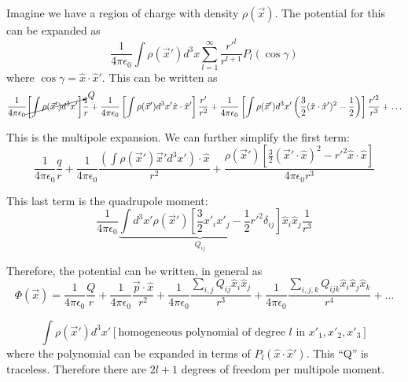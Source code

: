\documentclass[a4paper,twoside,master.tex]{subfiles}
\begin{document}

Imagine we have a region of charge with density $\rho(\vec{x})$. The potential for this can be expanded as
\begin{equation}
    \frac{1}{4\pi\epsilon_0}\int\rho(\vec{x}')d^3x \sum_{l=1}^{\infty} \frac{r'^l}{r^{l+1}}P_l(\cos\gamma)
\end{equation}
where $\cos\gamma = \hat{x}\cdot \hat{x}'$. This can be written as
\begin{equation}
\frac{1}{4\pi\epsilon_0}\cancelto{Q}{\left[ \int\rho(\vec{x}') d^3x' \right]} \frac{1}{r} + \frac{1}{4\pi\epsilon_0}\left[ \int\rho(\vec{x}') d^3x' \hat{x}\cdot \hat{x}' \right] \frac{r'}{r^2} + \frac{1}{4\pi\epsilon_0}\left[ \int\rho(\vec{x}') d^3x' \left( \frac{3}{2}(\hat{x}\cdot \hat{x}')^2 - \frac{1}{2} \right)   \right] \frac{r'^2}{r^3} + \ldots
\end{equation}

This is the multipole expansion. We can further simplify the first term:
\begin{equation}
    \frac{1}{4\pi\epsilon_0}\frac{q}{r} + \frac{1}{4\pi\epsilon_0}\frac{(\int\rho(\vec{x}')\vec{x}'d^3x')\cdot \hat{x}}{r^2} + \frac{\rho(\vec{x}')\left[ \frac{3}{2}(\vec{x}'\cdot \hat{x})^2 - r'^2\hat{x}\cdot \hat{x} \right]}{4\pi\epsilon_0r^3}
\end{equation}

This last term is the quadrupole moment:
\begin{equation}
    \frac{1}{4\pi\epsilon_0}\underbrace{\int d^3x'\rho(\vec{x}')\left[ \frac{3}{2}x'_i x'_j - \frac{1}{2}r'^2\delta_{ij} \right]}_{Q_{ij}} \hat{x}_i\hat{x}_j \frac{1}{r^3}
\end{equation}

Therefore, the potential can be written, in general as
\begin{equation}
    \Phi(\vec{x}) = \frac{1}{4\pi\epsilon_0}\frac{Q}{r}+ \frac{1}{4\pi\epsilon_0}\frac{\vec{p}\cdot \hat{x}}{r^2}+\frac{1}{4\pi\epsilon_0} \frac{\sum_{i,j} Q_{ij}\hat{x}_i \hat{x}_j}{r^3} + \frac{1}{4\pi\epsilon_0}\frac{\sum_{i,j,k}Q_{ijk}\hat{x}_i\hat{x}_j\hat{x}_k}{r^{4}}+\ldots
\end{equation}

\begin{remark}
   \begin{equation}
       \int\rho(\vec{x}')d^3x' [\text{homogeneous polynomial of degree } l \text{ in } x'_1,x'_2,x'_3]
   \end{equation}
   where the polynomial can be expanded in terms of $P_l(\hat{x}\cdot \hat{x}')$. This ``Q'' is traceless. Therefore there are $2l+1$ degrees of freedom per multipole moment.
\end{remark}
\end{document}
